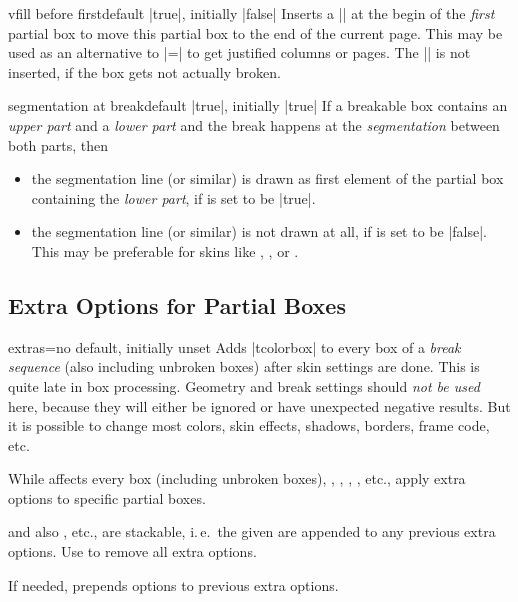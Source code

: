\begin{docTcbKey}{vfill before first}{}{default |true|, initially |false|}
  Inserts a |\vfill| at the begin of the \emph{first} partial box to move this
  partial box to the end of the current page. This may be used as an alternative
  to |=| to get justified
  columns or pages. The |\vfill| is not inserted, if the box gets not
  actually broken.
\end{docTcbKey}


\begin{docTcbKey}[][doc new=2017-03-20]{segmentation at break}{}{default |true|, initially |true|}
  If a breakable box contains an \emph{upper part} and a \emph{lower part} and
  the break happens at the \emph{segmentation} between both parts, then
  \begin{itemize}
  \item the segmentation line (or similar) is drawn as first element of the
    partial box containing the \emph{lower part}, if 
    is set to be |true|.
  \item the segmentation line (or similar) is not drawn at all, if
     is set to be |false|.
    This may be preferable for skins like , ,
    or .
  \end{itemize}
\end{docTcbKey}


\clearpage
\subsection{Extra Options for Partial Boxes}\label{subsec:extras}


\begin{docTcbKey}[][doc new=2015-07-16]{extras}{=}{no default, initially unset}
  Adds |tcolorbox|  to every box of a \emph{break sequence}
  (also including unbroken boxes) after skin settings are done. This is quite late in box processing.
  Geometry and break settings should \emph{not be used} here, because they
  will either be ignored or have unexpected negative results. But it is possible
  to change most colors, skin effects, shadows, borders, frame code, etc.\par
  While  affects every box (including unbroken boxes),
  , , ,
  , etc., apply extra options to specific partial
  boxes.\par
   and also , etc., are stackable,
  i.\,e.\ the given  are appended to any previous extra options.
  Use  to remove all extra options.\par
  If needed,  prepends options to previous extra options.
\end{docTcbKey}


